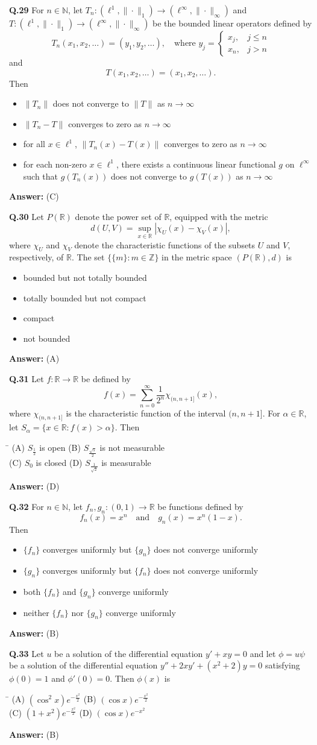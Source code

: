 \documentclass[11pt,a4paper]{article}
\newcommand{\optsfourA}[4]{%
  \begin{tabbing}
    \hspace{0.48\linewidth}\=\kill
    (A) #1 \> (B) #2 \\[2pt]
    (C) #3 \> (D) #4
  \end{tabbing}%
}
\newcommand{\optslistA}[4]{%
  \begin{itemize}
    \setlength{\itemsep}{2pt}\setlength{\parskip}{0pt}
    \item[(A)] #1
    \item[(B)] #2
    \item[(C)] #3
    \item[(D)] #4
  \end{itemize}%
}
\newcommand{\ans}[1]{\textbf{Answer:} #1\par\medskip}
\begin{document}
\textbf{Q.29} For $n \in \mathbb{N}$, let $T_n : (\ell^1, \|\cdot\|_1) \to (\ell^\infty, \|\cdot\|_\infty)$ and $T : (\ell^1, \|\cdot\|_1) \to (\ell^\infty, \|\cdot\|_\infty)$ be the bounded linear operators defined by
\[
  T_n(x_1, x_2, \dots) = (y_1, y_2, \dots), \quad \text{where } y_j = \begin{cases} x_j, & j \le n \\ x_n, & j > n \end{cases}
\]
and
\[
  T(x_1, x_2, \dots) = (x_1, x_2, \dots).
\]
Then
\optslistA{$\|T_n\|$ does not converge to $\|T\|$ as $n \to \infty$}{$\|T_n - T\|$ converges to zero as $n \to \infty$}{for all $x \in \ell^1$, $\|T_n(x) - T(x)\|$ converges to zero as $n \to \infty$}{for each non-zero $x \in \ell^1$, there exists a continuous linear functional $g$ on $\ell^\infty$ such that $g(T_n(x))$ does not converge to $g(T(x))$ as $n \to \infty$}
\ans{(C)}

\textbf{Q.30} Let $P(\mathbb{R})$ denote the power set of $\mathbb{R}$, equipped with the metric
\[
  d(U, V) = \sup_{x \in \mathbb{R}} |\chi_U(x) - \chi_V(x)|,
\]
where $\chi_U$ and $\chi_V$ denote the characteristic functions of the subsets $U$ and $V$, respectively, of $\mathbb{R}$. The set $\{\{m\} : m \in \mathbb{Z}\}$ in the metric space $(P(\mathbb{R}), d)$ is
\optslistA{bounded but not totally bounded}{totally bounded but not compact}{compact}{not bounded}
\ans{(A)}

\textbf{Q.31} Let $f : \mathbb{R} \to \mathbb{R}$ be defined by
\[
  f(x) = \sum_{n=0}^{\infty} \frac{1}{2^n} \chi_{(n, n+1]}(x),
\]
where $\chi_{(n, n+1]}$ is the characteristic function of the interval $(n, n+1]$. For $\alpha \in \mathbb{R}$, let $S_\alpha = \{x \in \mathbb{R} : f(x) > \alpha\}$. Then
\optsfourA{$S_{\frac{1}{2}}$ is open}{$S_{\frac{\sqrt{5}}{2}}$ is not measurable}{$S_0$ is closed}{$S_{\frac{1}{\sqrt{2}}}$ is measurable}
\ans{(D)}

\textbf{Q.32} For $n \in \mathbb{N}$, let $f_n, g_n : (0, 1) \to \mathbb{R}$ be functions defined by
\[
  f_n(x) = x^n \quad \text{and} \quad g_n(x) = x^n (1 - x).
\]
Then
\optslistA{$\{f_n\}$ converges uniformly but $\{g_n\}$ does not converge uniformly}{$\{g_n\}$ converges uniformly but $\{f_n\}$ does not converge uniformly}{both $\{f_n\}$ and $\{g_n\}$ converge uniformly}{neither $\{f_n\}$ nor $\{g_n\}$ converge uniformly}
\ans{(B)}

\textbf{Q.33} Let $u$ be a solution of the differential equation $y' + xy = 0$ and let $\phi = u\psi$ be a solution of the differential equation $y'' + 2xy' + (x^2 + 2)y = 0$ satisfying $\phi(0) = 1$ and $\phi'(0) = 0$. Then $\phi(x)$ is
\optsfourA{$(\cos^2 x) e^{-\frac{x^2}{2}}$}{$(\cos x) e^{-\frac{x^2}{2}}$}{$(1 + x^2) e^{-\frac{x^2}{2}}$}{$(\cos x) e^{-x^2}$}
\ans{(B)}
\end{document}
